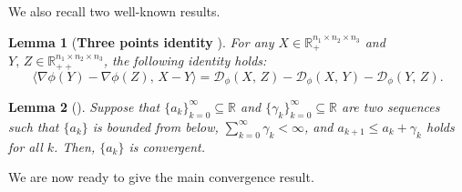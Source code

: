 \documentclass[10pt]{article}
\newtheorem{lemma}{Lemma}
\begin{document}
We also recall two well-known results.

\begin{lemma}[{\bf Three points identity}\label{threeIdenity}
{\cite[Lemma 3.1]{ct1993convergence}}]\label{lem3eq}
For any $X\in\mathbb{R}^{n_1 \times n_2 \times n_3}_+$ and $Y,\,Z\in\mathbb{R}^{n_1 \times n_2 \times n_3}_{++}$, the following identity holds:
\begin{equation*}
\langle \nabla\phi(Y)-\nabla\phi(Z),\,X-Y \rangle = \mathcal{D}_{\phi}(X,\,Z)-\mathcal{D}_{\phi}(X,\,Y)-\mathcal{D}_{\phi}(Y,\,Z).
\end{equation*}
\end{lemma}

\begin{lemma}[{\cite[Section 2.2]{p1987introduction}}]\label{lemseqcon}
Suppose that $\{a_k\}_{k=0}^{\infty}\subseteq\mathbb{R}$ and $\{\gamma_k\}_{k=0}^{\infty}\subseteq\mathbb{R}$ are two sequences such that $\{a_k\}$ is bounded from below, $\sum_{k=0}^{\infty} \gamma_k < \infty$, and $a_{k+1} \leq a_{k} + \gamma_k$ holds for all $k$. Then, $\{a_k\}$ is convergent.
\end{lemma}

We are now ready to give the main convergence result.
\end{document}
